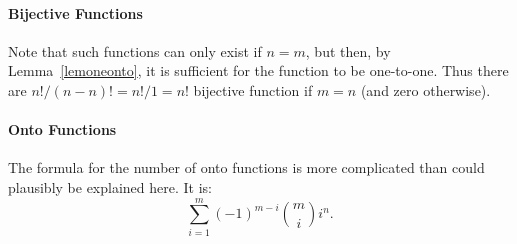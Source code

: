 \paragraph{Bijective Functions}
Note that such functions can only exist if $n=m$, but then, by Lemma~\ref{lemoneonto},
it is sufficient for the function to be one-to-one. Thus there are $n!/(n-n)!=n!/1=n!$
bijective function if $m=n$ (and zero otherwise).

\paragraph{Onto Functions}
The formula for the number of onto functions is more complicated than could plausibly be
explained here. It is:
\[
\sum_{i=1}^m (-1)^{m-i}{m\choose i}i^n.
\]


